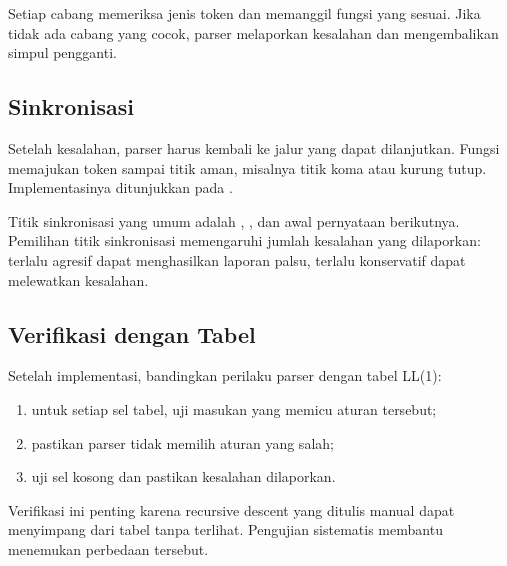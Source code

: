 
Setiap cabang memeriksa jenis token dan memanggil fungsi yang sesuai.
Jika tidak ada cabang yang cocok, parser melaporkan kesalahan dan
mengembalikan simpul pengganti.

\subsection{Sinkronisasi}

Setelah kesalahan, parser harus kembali ke jalur yang dapat
dilanjutkan. Fungsi  memajukan token sampai titik
aman, misalnya titik koma atau kurung tutup. Implementasinya
ditunjukkan pada .


Titik sinkronisasi yang umum adalah \code{;}, \code{\}}, dan awal
pernyataan berikutnya. Pemilihan titik sinkronisasi memengaruhi
jumlah kesalahan yang dilaporkan: terlalu agresif dapat menghasilkan
laporan palsu, terlalu konservatif dapat melewatkan kesalahan.

\subsection{Verifikasi dengan Tabel}

Setelah implementasi, bandingkan perilaku parser dengan tabel LL(1):
\begin{enumerate}[label=\arabic*.,leftmargin=*]
  \item untuk setiap sel tabel, uji masukan yang memicu aturan
        tersebut;
  \item pastikan parser tidak memilih aturan yang salah;
  \item uji sel kosong dan pastikan kesalahan dilaporkan.
\end{enumerate}

Verifikasi ini penting karena recursive descent yang ditulis manual
dapat menyimpang dari tabel tanpa terlihat. Pengujian sistematis
membantu menemukan perbedaan tersebut.
